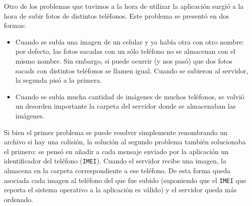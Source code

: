 Otro de los problemas que tuvimos a la hora de utilizar la aplicación surgió a la hora de subir fotos de distintos teléfonos. Este problema se presentó en dos formas:
\begin{itemize}
	\item Cuando se subía una imagen de un celular y ya había otra con otro nombre: por defecto, las fotos sacadas con un sólo teléfono no se almacenan con el mismo nombre. Sin embargo, si puede ocurrir (y nos pasó) que dos fotos sacads con distintos teléfonos se llamen igual. Cuando se subieron al servidor, la segunda pisó a la primera.
	\item Cuando se subía mucha cantidad de imágenes de muchos teléfonos, se volvió un desorden importante la carpeta del servidor donde se almacenaban las imágenes.
\end{itemize}

Si bien el primer problema se puede resolver simplemente renombrando un archivo si hay una colisión, la solución al segundo problema también solucionaba el primero: se pensó en añadir a cada mensaje enviado por la aplicación un identificador del teléfono (\texttt{IMEI}). Cuando el servidor recibe una imagen, la almacena en la carpeta correspondiente a ese teléfono. De esta forma queda asociada cada imagen al teléfono del que fue subido (suponiendo que el \texttt{IMEI} que reporta el sistema operativo a la aplicación es válido) y el servidor queda más ordenado.
